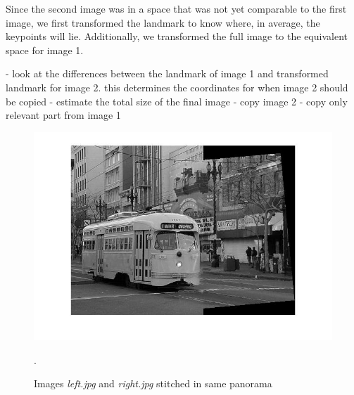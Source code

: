 \documentclass[11pt]{article}
\begin{document}
Since the second image was in a space that was not yet comparable to the first image, we first transformed the landmark to know where, in average, the keypoints will lie. Additionally, we transformed the full image to the equivalent space for image 1. 

- look at the differences between the landmark of image 1 and transformed landmark for image 2. this determines the coordinates for when image 2 should be copied
-  estimate the total size of the final image
- copy image 2
- copy only relevant part from image 1  

\begin{figure}[htpb]
	\centering
	\includegraphics[width=1\textwidth]{imgs/stitched.jpg}
	\caption{Images \textit{left.jpg} and \textit{right.jpg} stitched in same panorama}.
	\label{fig:stitched}
\end{figure}
\end{document}
